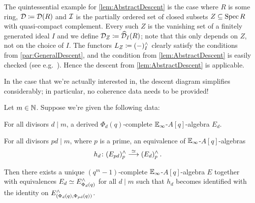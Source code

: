 \documentclass[DIV=12,numbers=enddot,leqno,bibliography=totoc]{scrartcl}
\begin{document}
	\begin{rem}\label{rem:CompleteDescent}
		The quintessential example for \cref{lem:AbstractDescent} is the case where $R$ is some ring, $\Dd\coloneqq \Dd(R)$ and $\mathcal{I}$ is the partially ordered set of closed subsets $Z\subseteq \operatorname{Spec} R$ with quasi-compact complement. Every such $Z$ is the vanishing set of a finitely generated ideal $I$ and we define $\Dd_Z\coloneqq \widehat{\Dd}_I(R)$; note that this only depends on $Z$, not on the choice of $I$. The functors $L_Z\coloneqq (-)_I^\complete$ clearly satisfy the conditions from \cref{par:GeneralDescent}, and the condition from \cref{lem:AbstractDescent} is easily checked (see e.g.\ \cite[Lemma~]{qWitt}). Hence the descent from \cref{lem:AbstractDescent} is applicable.
	\end{rem}
	In the case that we're actually interested in, the descent diagram simplifies considerably; in particular, no coherence data needs to be provided!
	\begin{cor}\label{cor:CompleteDescent}
		Let $m\in\mathbb{N}$. Suppose we're given the following data:
		\begin{alphanumerate}
			\item For all divisors $d\mid m$, a derived $\Phi_d(q)$-complete $\mathbb{E}_\infty$-$A[q]$-algebra $E_d$.\label{enum:CompleteDescentLocalData}
			\item For all divisors $pd\mid m$, where $p$ is a prime, an equivalence of $\mathbb{E}_\infty$-$A[q]$-algebras\label{enum:CompleteDescentGluingData}
			\begin{equation*}
				h_{d}\colon (E_{pd})_p^\complete\overset{\simeq}{\longrightarrow}(E_d)_p^\complete\,.
			\end{equation*}
		\end{alphanumerate}
		Then there exists a unique $(q^m-1)$-complete $\mathbb{E}_\infty$-$A[q]$-algebra $E$ together with equivalences $E_d\simeq E_{\Phi_d(q)}^\wedge$ for all $d\mid m$ such that $h_d$ becomes identified with the identity on $E_{(\Phi_d(q),\Phi_{pd}(q))}^\wedge$.
	\end{cor}
\end{document}
